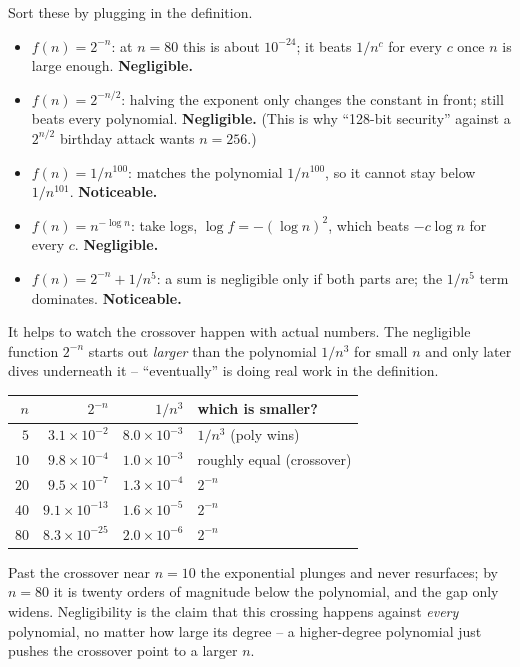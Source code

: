\begin{example}
\label{ch08:ex-negl}
Sort these by plugging in the definition.
\begin{itemize}
\item $f(n) = 2^{-n}$: at $n=80$ this is about $10^{-24}$; it beats $1/n^c$ for every $c$ once $n$ is large enough. \textbf{Negligible.}
\item $f(n) = 2^{-n/2}$: halving the exponent only changes the constant in front; still beats every polynomial. \textbf{Negligible.} (This is why ``128-bit security'' against a $2^{n/2}$ birthday attack wants $n = 256$.)
\item $f(n) = 1/n^{100}$: matches the polynomial $1/n^{100}$, so it cannot stay below $1/n^{101}$. \textbf{Noticeable.}
\item $f(n) = n^{-\log n}$: take logs, $\log f = -(\log n)^2$, which beats $-c\log n$ for every $c$. \textbf{Negligible.}
\item $f(n) = 2^{-n} + 1/n^{5}$: a sum is negligible only if both parts are; the $1/n^5$ term dominates. \textbf{Noticeable.}
\end{itemize}
\end{example}

It helps to watch the crossover happen with actual numbers. The negligible function $2^{-n}$ starts out \emph{larger} than the polynomial $1/n^{3}$ for small $n$ and only later dives underneath it -- ``eventually'' is doing real work in the definition.

\begin{center}
\begin{tabular}{r r r l}
\toprule
$n$ & $2^{-n}$ & $1/n^{3}$ & which is smaller? \\
\midrule
$5$    & $3.1\times 10^{-2}$  & $8.0\times 10^{-3}$  & $1/n^3$ (poly wins) \\
$10$   & $9.8\times 10^{-4}$  & $1.0\times 10^{-3}$  & roughly equal (crossover) \\
$20$   & $9.5\times 10^{-7}$  & $1.3\times 10^{-4}$  & $2^{-n}$ \\
$40$   & $9.1\times 10^{-13}$ & $1.6\times 10^{-5}$  & $2^{-n}$ \\
$80$   & $8.3\times 10^{-25}$ & $2.0\times 10^{-6}$  & $2^{-n}$ \\
\bottomrule
\end{tabular}
\end{center}

Past the crossover near $n=10$ the exponential plunges and never resurfaces; by $n=80$ it is twenty orders of magnitude below the polynomial, and the gap only widens. Negligibility is the claim that this crossing happens against \emph{every} polynomial, no matter how large its degree -- a higher-degree polynomial just pushes the crossover point to a larger $n$.

